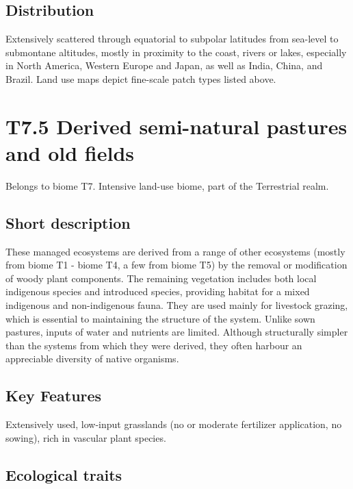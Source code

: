\documentclass[
  letterpaper,
  DIV=11,
  numbers=noendperiod]{scrartcl}
\begin{document}
\subsection{Distribution}\label{distribution-101}

Extensively scattered through equatorial to subpolar latitudes from
sea-level to submontane altitudes, mostly in proximity to the coast,
rivers or lakes, especially in North America, Western Europe and Japan,
as well as India, China, and Brazil. Land use maps depict fine-scale
patch types listed above.

\section{T7.5 Derived semi-natural pastures and old
fields}\label{t7.5-derived-semi-natural-pastures-and-old-fields}

Belongs to biome T7. Intensive land-use biome, part of the Terrestrial
realm.

\subsection{Short description}\label{short-description-102}

These managed ecosystems are derived from a range of other ecosystems
(mostly from biome T1 - biome T4, a few from biome T5) by the removal or
modification of woody plant components. The remaining vegetation
includes both local indigenous species and introduced species, providing
habitat for a mixed indigenous and non-indigenous fauna. They are used
mainly for livestock grazing, which is essential to maintaining the
structure of the system. Unlike sown pastures, inputs of water and
nutrients are limited. Although structurally simpler than the systems
from which they were derived, they often harbour an appreciable
diversity of native organisms.

\subsection{Key Features}\label{key-features-102}

Extensively used, low-input grasslands (no or moderate fertilizer
application, no sowing), rich in vascular plant species.

\subsection{Ecological traits}\label{ecological-traits-102}
\end{document}
